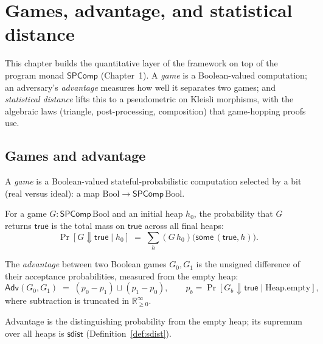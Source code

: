 \chapter{Games, advantage, and statistical distance}

This chapter builds the quantitative layer of the framework on top of the program
monad $\mathsf{SPComp}$ (Chapter~1). A \emph{game} is a Boolean-valued computation;
an adversary's \emph{advantage} measures how well it separates two games; and
\emph{statistical distance} lifts this to a pseudometric on Kleisli morphisms, with
the algebraic laws (triangle, post-processing, composition) that game-hopping proofs
use.

\section{Games and advantage}

\begin{definition}[Game]
  \label{def:game}
  \leanok
  A \emph{game} is a Boolean-valued stateful-probabilistic computation selected by
  a bit (real versus ideal): a map $\mathrm{Bool} \to \mathsf{SPComp}\,\mathrm{Bool}$.
\end{definition}

\begin{definition}
  \label{def:prtrue}
  \leanok
  For a game $G : \mathsf{SPComp}\,\mathrm{Bool}$ and an initial heap $h_0$, the
  probability that $G$ returns $\mathsf{true}$ is the total mass on $\mathsf{true}$
  across all final heaps:
  \[
    \Pr[G \Downarrow \mathsf{true} \mid h_0]
      \;=\; \sum_{h} (G\,h_0)\bigl(\mathsf{some}\,(\mathsf{true}, h)\bigr).
  \]
\end{definition}

\begin{definition}[Advantage]
  \label{def:advantage}
  \leanok
  The \emph{advantage} between two Boolean games $G_0, G_1$ is the unsigned
  difference of their acceptance probabilities, measured from the empty heap:
  \[
    \mathsf{Adv}(G_0, G_1)
      \;=\; (p_0 - p_1) \sqcup (p_1 - p_0),
      \qquad p_b = \Pr[G_b \Downarrow \mathsf{true} \mid \mathrm{Heap.empty}],
  \]
  where subtraction is truncated in $\mathbb{R}_{\ge 0}^{\infty}$.
\end{definition}

Advantage is the distinguishing probability from the empty heap; its supremum over all
heaps is $\mathsf{sdist}$ (Definition~\ref{def:sdist}).

